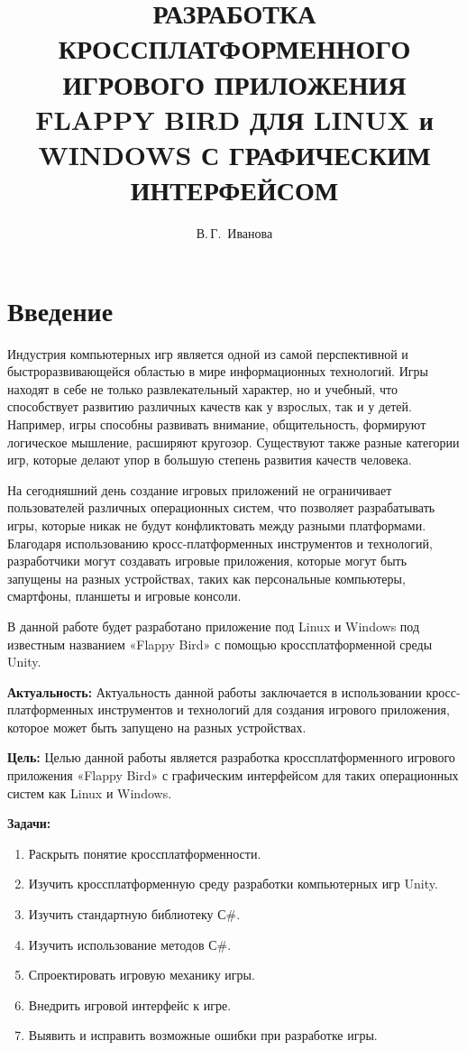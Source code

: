 \documentclass[14pt, oneside]{altsu-report}
\title{РАЗРАБОТКА КРОССПЛАТФОРМЕННОГО ИГРОВОГО ПРИЛОЖЕНИЯ FLAPPY BIRD ДЛЯ LINUX и WINDOWS С ГРАФИЧЕСКИМ ИНТЕРФЕЙСОМ}
\author{В.\,Г.~Иванова}
\institute{Институт цифровых технологий, электроники и физики}
\date{\the\year}
\begin{document}
\maketitle

\setcounter{page}{2}
\makeabstract
\tableofcontents

\chapter*{Введение}

Индустрия компьютерных игр является одной из самой перспективной и быстроразвивающейся областью в мире информационных технологий. Игры находят в себе не только развлекательный характер, но и учебный, что способствует развитию различных качеств как у взрослых, так и у детей. Например, игры способны развивать внимание, общительность, формируют логическое мышление, расширяют кругозор. Существуют также разные категории игр, которые делают упор в большую степень развития качеств человека.

На сегодняшний день создание игровых приложений не ограничивает пользователей различных операционных систем, что позволяет разрабатывать игры, которые никак не будут конфликтовать между разными платформами. Благодаря использованию кросс-платформенных инструментов и технологий, разработчики могут создавать игровые приложения, которые могут быть запущены на разных устройствах, таких как персональные компьютеры, смартфоны, планшеты и игровые консоли.

В данной работе будет разработано приложение под  Linux и Windows под известным названием «Flappy Bird» с помощью кроссплатформенной среды Unity.

\textbf{Актуальность:} 
Актуальность данной работы заключается в использовании кросс-платформенных инструментов и технологий для создания игрового приложения, которое может быть запущено на разных устройствах. 

\textbf{Цель:}
Целью данной работы является разработка кроссплатформенного игрового приложения «Flappy Bird» с графическим интерфейсом для таких операционных систем как Linux и Windows.

\textbf{Задачи:}
\begin{enumerate}
\item Раскрыть понятие кроссплатформенности.
\item Изучить кроссплатформенную среду разработки компьютерных игр Unity.
\item Изучить стандартную библиотеку С\#.
\item Изучить использование методов С\#.
\item Спроектировать игровую механику игры.
\item Внедрить игровой интерфейс к игре.
\item Выявить и исправить возможные ошибки при разработке игры.
\end{enumerate}
\end{document}
